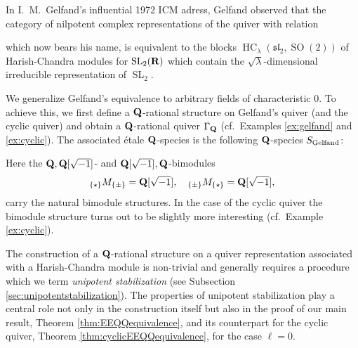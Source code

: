 \documentclass[a4paper,12pt,reqno]{amsart}
\newcommand{\RR}{{\rm\bf R}}
\newcommand{\QQ}{{\rm\bf Q}}
\DeclareMathOperator{\SL}{\mathrm{SL}}
\DeclareMathOperator{\SO}{\mathrm{SO}}
\DeclareMathOperator{\HC}{\mathrm{HC}}
\newcommand{\liesl}{{\mathfrak {sl}}}
\theoremstyle{plain}
\theoremstyle{remark}
\begin{document}
    In I.~M.~Gelfand's influential 1972 ICM adress, Gelfand observed that the category of nilpotent complex representations of the quiver with relation
    \begin{center}
    \end{center}
    which now bears his name, is equivalent to the blocks $\HC_\lambda(\liesl_2,\SO(2))$ of Harish-Chandra modules for $\SL_2(\RR)$ which contain the $\sqrt{\lambda}$-dimensional irreducible representation of $\SL_2$.

    We generalize Gelfand's equivalence to arbitrary fields of characteristic $0$. To achieve this, we first define a $\QQ$-rational structure on Gelfand's quiver (and the cyclic quiver) and obtain a $\QQ$-rational quiver $\Gamma_\QQ$ (cf.\ Examples \ref{ex:gelfand} and \ref{ex:cyclic}). The associated \'etale $\QQ$-species is the following $\QQ$-species $S_{\rm Gelfand}$:
    \begin{center}
    \end{center}
    Here the $\QQ,\QQ[\sqrt{-1}]$- and $\QQ[\sqrt{-1}],\QQ$-bimodules
    \[
      {}_{\{\star\}}M_{\{\pm\}}=\QQ[\sqrt{-1}],\quad
      {}_{\{\pm\}}M_{\{\star\}}=\QQ[\sqrt{-1}],
    \]
    carry the natural bimodule structures. In the case of the cyclic quiver the bimodule structure turns out to be slightly more interesting (cf.\ Example \ref{ex:cyclic}).

    The construction of a $\QQ$-rational structure on a quiver representation associated with a Harish-Chandra module is non-trivial and generally requires a procedure which we term {\em unipotent stabilization} (see Subsection \ref{sec:unipotentstabilization}). The properties of unipotent stabilization play a central role not only in the construction itself but also in the proof of our main result, Theorem \ref{thm:EEQQequivalence}, and its counterpart for the cyclic quiver, Theorem \ref{thm:cyclicEEQQequivalence}, for the case $\ell=0$.
\end{document}
